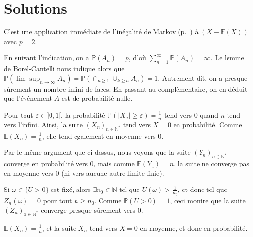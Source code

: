 \chapter{Solutions}

\label{IV-answer-bienaymuxe9cheby}
C'est une application immédiate de
\protect\hyperref[IV-inegmarkov]{l'inégalité de
Markov (p.~\pageref*{IV-inegmarkov})} à \((X-\mathbb{E}(X))\) avec
\(p =2\).

\label{IV-answer-pf}
En suivant l'indication, on a \(\mathbb{P}(A_n) = p\), d'où
\(\sum_{n=1}^\infty \mathbb{P}(A_n) = \infty\). Le lemme de
Borel-Cantelli nous indique alors que
\(\mathbb{P}(\lim \sup_{n \to \infty} A_n) = \mathbb{P}\left(\cap_{n\geq 1} \cup_{k \geq n} A_n \right) = 1\).
Autrement dit, on a presque sûrement un nombre infini de faces. En
passant au complémentaire, on en déduit que l'événement \(A\) est de
probabilité nulle.

\label{IV-answer-lien}
Pour tout \(\varepsilon \in ]0,1[\), la probabilité
\(\mathbb{P}(|X_n|\geq \varepsilon) = \frac{1}{n}\) tend vers 0 quand
\(n\) tend vers l'infini. Ainsi, la suite
\((X_n)_{n\in \mathbb{N}^\ast}\) tend vers \(X=0\) en probabilité. Comme
\(\mathbb{E}(X_n) = \frac{1}{n}\), elle tend également en moyenne vers
0.

\label{IV-answer-lien2}
Par le même argument que ci-dessus, nous voyons que la suite
\((Y_n)_{n\in \mathbb{N}^\ast}\) converge en probabilité vers 0, mais
comme \(\mathbb{E}(Y_n) = n\), la suite ne converge pas en moyenne vers
0 (ni vers aucune autre limite finie).

\label{IV-answer-lien3}
Si \(\omega \in \{U > 0\}\) est fixé, alors
\(\exists n_0 \in \mathbb{N}\) tel que \(U(\omega) > \frac{1}{n_0}\), et
donc tel que \(Z_n(\omega) = 0\) pour tout \(n \geq n_0\). Comme
\(\mathbb{P}(U>0)=1\), ceci montre que la suite
\((Z_n)_{n\in \mathbb{N}^\ast}\) converge presque sûrement vers 0.

\label{IV-answer-ia}
\(\mathbb{E}(X_n) = \frac{1}{n}\), et la suite \(X_n\) tend vers
\(X = 0\) en moyenne, et donc en probabilité.

